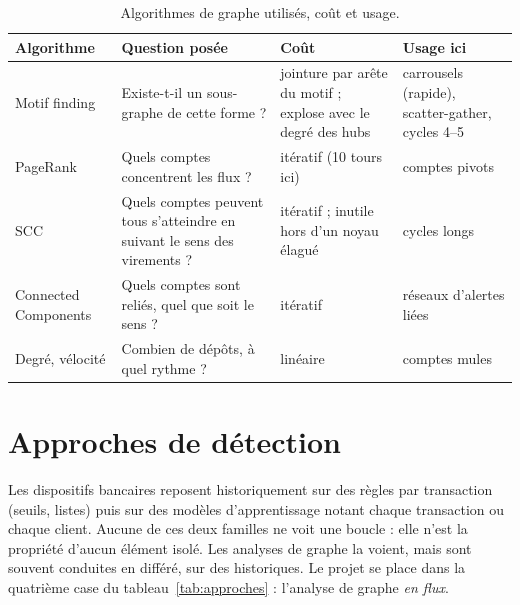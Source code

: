 \begin{table}[htp]
\centering\small
\begin{tabular}{@{}>{\raggedright\arraybackslash}p{2.7cm}>{\raggedright\arraybackslash}p{4.4cm}>{\raggedright\arraybackslash}p{3.7cm}>{\raggedright\arraybackslash}p{3.3cm}@{}}
\toprule
\sffamily\bfseries Algorithme & \sffamily\bfseries Question posée & \sffamily\bfseries Coût & \sffamily\bfseries Usage ici\\
\midrule
Motif finding & Existe-t-il un sous-graphe de cette forme ? & 1 jointure par arête du motif ; explose avec le degré des hubs & carrousels (rapide), scatter-gather, cycles 4--5\\
PageRank & Quels comptes concentrent les flux ? & itératif (10 tours ici) & comptes pivots\\
SCC & Quels comptes peuvent tous s'atteindre en suivant le sens des virements ? & itératif ; inutile hors d'un noyau élagué & cycles longs\\
Connected Components & Quels comptes sont reliés, quel que soit le sens ? & itératif & réseaux d'alertes liées\\
Degré, vélocité & Combien de dépôts, à quel rythme ? & linéaire & comptes mules\\
\bottomrule
\end{tabular}
\caption{Algorithmes de graphe utilisés, coût et usage.}
\label{tab:algos}
\end{table}

\section{Approches de détection}
Les dispositifs bancaires reposent historiquement sur des règles par
transaction (seuils, listes) puis sur des modèles d'apprentissage notant
chaque transaction ou chaque client. Aucune de ces deux familles ne voit une
boucle : elle n'est la propriété d'aucun élément isolé. Les analyses de
graphe la voient, mais sont souvent conduites en différé, sur des
historiques. Le projet se place dans la quatrième case du
tableau~\ref{tab:approches} : l'analyse de graphe \emph{en flux}.

